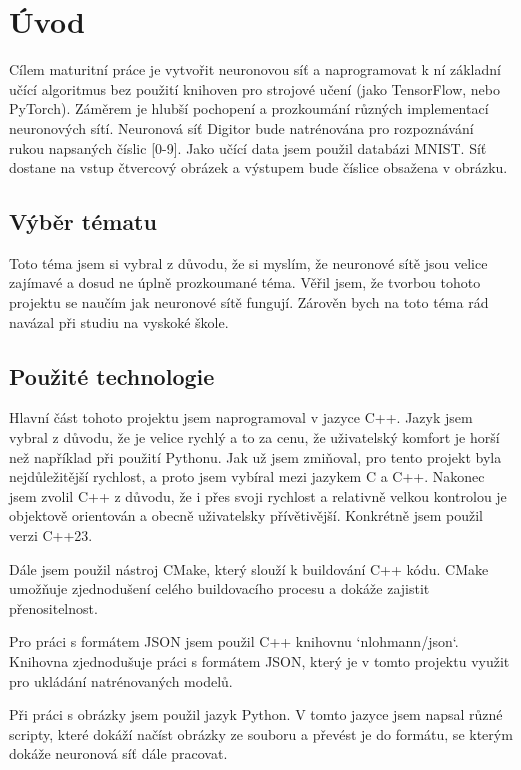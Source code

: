 \section{Úvod}
Cílem maturitní práce je vytvořit neuronovou síť a naprogramovat k ní základní učící algoritmus bez použití knihoven pro strojové učení (jako TensorFlow, nebo PyTorch).
Záměrem je hlubší pochopení a prozkoumání různých implementací neuronových sítí.
Neuronová síť Digitor bude natrénována pro rozpoznávání rukou napsaných číslic [0-9]. Jako učící data jsem použil databázi MNIST\cite{mnist}.
Síť dostane na vstup čtvercový obrázek a výstupem bude číslice obsažena v obrázku.

\subsection{Výběr tématu}
Toto téma jsem si vybral z důvodu, že si myslím, že neuronové sítě jsou velice zajímavé a dosud ne úplně prozkoumané téma.
Věřil jsem, že tvorbou tohoto projektu se naučím jak neuronové sítě fungují.
Zárověn bych na toto téma rád navázal při studiu na vyskoké škole.

\subsection{Použité technologie}
Hlavní část tohoto projektu jsem naprogramoval v jazyce C++.
Jazyk jsem vybral z důvodu, že je velice rychlý a to za cenu, že uživatelský komfort je horší než například při použití Pythonu.
Jak už jsem zmiňoval, pro tento projekt byla nejdůležitější rychlost, a proto jsem vybíral mezi jazykem C a C++.
Nakonec jsem zvolil C++ z důvodu, že i přes svoji rychlost a relativně velkou kontrolou je objektově orientován a obecně uživatelsky přívětivější.
Konkrétně jsem použil verzi C++23.

Dále jsem použil nástroj CMake, který slouží k buildování C++ kódu.
CMake umožňuje zjednodušení celého buildovacího procesu a dokáže zajistit přenositelnost.

Pro práci s formátem JSON jsem použil C++ knihovnu `nlohmann/json`\cite{json}.
Knihovna zjednodušuje práci s formátem JSON, který je v tomto projektu využit pro ukládání natrénovaných modelů.

Při práci s obrázky jsem použil jazyk Python. V tomto jazyce jsem napsal různé scripty,
které dokáží načíst obrázky ze souboru a převést je do formátu, se kterým dokáže neuronová síť dále pracovat.

